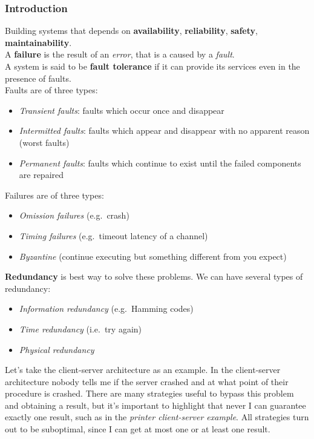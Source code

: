 \subsubsection{Introduction}\label{introduction}

Building systems that depends on \textbf{availability},
\textbf{reliability}, \textbf{safety}, \textbf{maintainability}.\\
A \textbf{failure} is the result of an \emph{error}, that is a caused by
a \emph{fault}.\\
A system is said to be \textbf{fault tolerance} if it can provide its
services even in the presence of faults.\\
Faults are of three types:
\begin{itemize}
\itemsep1pt\parskip0pt
\item
  \emph{Transient faults}: faults which occur once and disappear
\item
  \emph{Intermitted faults}: faults which appear and disappear with no
  apparent reason (worst faults)
\item
  \emph{Permanent faults}: faults which continue to exist until the
  failed components are repaired
\end{itemize}
Failures are of three types:

\begin{itemize}
\itemsep1pt\parskip0pt
\item
  \emph{Omission failures} (e.g.~crash)
\item
  \emph{Timing failures} (e.g.~timeout latency of a channel)
\item
  \emph{Byzantine} (continue executing but something different from you
  expect)
\end{itemize}
\textbf{Redundancy} is best way to solve these problems. We can have several types of redundancy:

\begin{itemize}
\itemsep1pt\parskip0pt
\item
  \emph{Information redundancy} (e.g.~Hamming codes)
\item
  \emph{Time redundancy} (i.e.~try again)
\item
  \emph{Physical redundancy}
\end{itemize}

Let's take the client-server architecture as an example. In the client-server architecture nobody tells me if the server crashed and
at what point of their procedure is crashed. There are many strategies
useful to bypass this problem and obtaining a result, but it's important
to highlight that never I can guarantee exactly one result, such as in
the \emph{printer client-server example}. All strategies turn out to be
suboptimal, since I can get at most one or at least one result.

